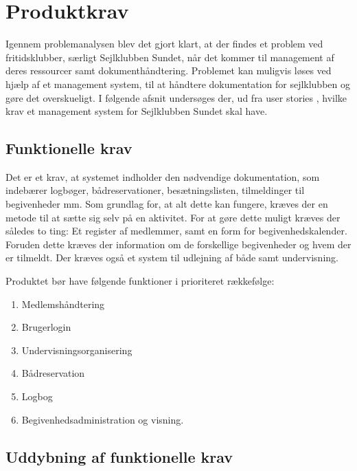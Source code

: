 \chapter{Produktkrav}

Igennem problemanalysen blev det gjort klart, at der findes et problem ved fritidsklubber, særligt Sejlklubben Sundet, når det kommer til management af deres ressourcer samt dokumenthåndtering. 
Problemet kan muligvis løses ved hjælp af et management system, til at håndtere dokumentation for sejlklubben og gøre det overskueligt. 
I følgende afsnit undersøges der, ud fra user stories , hvilke krav et management system for Sejlklubben Sundet skal have. 


\section{Funktionelle krav} \label{sec:funktionelleKrav}

Det er et krav, at systemet indholder den nødvendige dokumentation, som indebærer logbøger, bådreservationer, besætningslisten, tilmeldinger til begivenheder mm. 
Som grundlag for, at alt dette kan fungere, kræves der en metode til at sætte sig selv på en aktivitet. 
For at gøre dette muligt kræves der således to ting: Et register af medlemmer, samt en form for begivenhedskalender.
Foruden dette kræves der information om de forskellige begivenheder og hvem der er tilmeldt. 
Der kræves også et system til udlejning af både samt undervisning.

Produktet bør have følgende funktioner i prioriteret rækkefølge:
\begin{enumerate}
  \item Medlemshåndtering
  \item Brugerlogin
  \item Undervisningsorganisering 
  \item Bådreservation
  \item Logbog
  \item Begivenhedsadministration og visning.
\end{enumerate}



\section{Uddybning af funktionelle krav}

